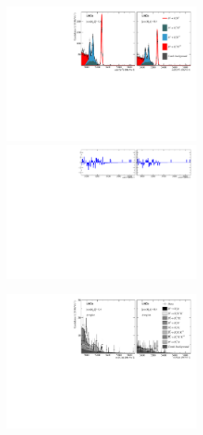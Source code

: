 \begin{figure}[!h]
    \centering
    \begin{subfigure}[t]{1.0\textwidth}
        \centering
        \includegraphics[width=0.7\textwidth]{figs/Appendix_FitCategories/canvas_DsD0_Ds2PhiPi_both_summed_splitHel_splitKKPi_s21_s21r1_s24_s26.pdf}\\
        \includegraphics[width=0.7\textwidth]{figs/Appendix_FitCategories/residuals_DsD0_Ds2PhiPi_both_summed_splitHel_splitKKPi_s21_s21r1_s24_s26.pdf}
    \end{subfigure}
    \begin{subfigure}[t]{1.0\textwidth}
        \centering
        \includegraphics[width=0.7\textwidth]{figs/Appendix_FitCategories/canvas_DsPhi_Ds2PhiPi_both_summed_splitHel_splitKKPi_s21_s21r1_s24_s26.pdf}\\

\end{subfigure}
\end{figure}
